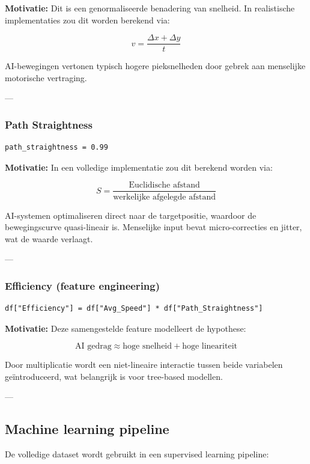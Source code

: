 \textbf{Motivatie:}  
Dit is een genormaliseerde benadering van snelheid. In realistische implementaties zou dit worden berekend via:

\[
v = \frac{\Delta x + \Delta y}{t}
\]

AI-bewegingen vertonen typisch hogere pieksnelheden door gebrek aan menselijke motorische vertraging.

---

\subsubsection{Path Straightness}

\begin{verbatim}
path_straightness = 0.99
\end{verbatim}

\textbf{Motivatie:}  
In een volledige implementatie zou dit berekend worden via:

\[
S = \frac{\text{Euclidische afstand}}{\text{werkelijke afgelegde afstand}}
\]

AI-systemen optimaliseren direct naar de targetpositie, waardoor de bewegingscurve quasi-lineair is. Menselijke input bevat micro-correcties en jitter, wat de waarde verlaagt.

---

\subsubsection{Efficiency (feature engineering)}

\begin{verbatim}
df["Efficiency"] = df["Avg_Speed"] * df["Path_Straightness"]
\end{verbatim}

\textbf{Motivatie:}  
Deze samengestelde feature modelleert de hypothese:

\[
\text{AI gedrag} \approx \text{hoge snelheid} + \text{hoge lineariteit}
\]

Door multiplicatie wordt een niet-lineaire interactie tussen beide variabelen geïntroduceerd, wat belangrijk is voor tree-based modellen.

---

\subsection{Machine learning pipeline}

De volledige dataset wordt gebruikt in een supervised learning pipeline:

